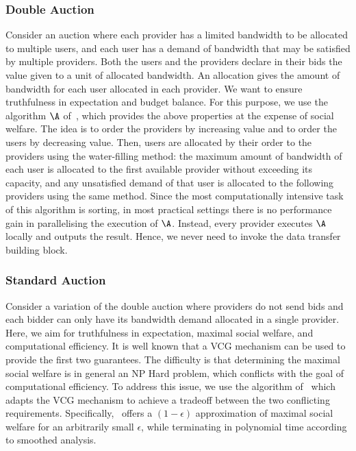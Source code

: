 \subsubsection{Double Auction}
\label{sec:instances-double-auction}
Consider an auction where each provider has a limited bandwidth to be allocated to multiple users,
and each user has a demand of bandwidth that may be satisfied by multiple providers.
Both the users and the providers declare in their bids 
the value given to a unit of allocated bandwidth. 
An allocation gives the amount of bandwidth for each user
allocated in each provider. We want to ensure truthfulness in expectation and budget balance.
For this purpose, we use the algorithm $\A$ of~\cite{Zheng2014Star},
which provides the above properties at the expense of social welfare. 
The idea is to order the providers by increasing
value and to order the users by decreasing value.
Then, users are allocated by their order to the providers using the water-filling method:
the maximum amount of bandwidth of each user is allocated
to the first available provider without exceeding its capacity,
and any unsatisfied demand of that user is allocated to the following providers using the same method.
Since the most computationally intensive task of this algorithm
is sorting, in most practical settings there is no performance gain in parallelising the execution of $\A$.
Instead, every provider executes $\A$ locally and outputs the result.
Hence, we never need to invoke the data transfer building block.


\subsubsection{Standard Auction}
\label{sec:instances-vcg}
Consider a variation of the double auction where providers
do not send bids and each bidder can only have its bandwidth demand
allocated in a single provider. Here, we aim for truthfulness
in expectation, maximal social welfare, and computational efficiency.
It is well known that a VCG mechanism can be used to provide the first two guarantees.
The difficulty is that determining the maximal
social welfare is in general an NP Hard problem,
which conflicts with the goal of computational efficiency.
To address this issue, we use the algorithm of~\cite{Zhang2015Truthful}
which adapts the VCG mechanism to achieve a tradeoff
between the two conflicting requirements. Specifically,
\cite{Zhang2015Truthful}~offers a $(1-\epsilon)$ approximation
of maximal social welfare for an arbitrarily small $\epsilon$,
while terminating in polynomial time according to smoothed analysis.

